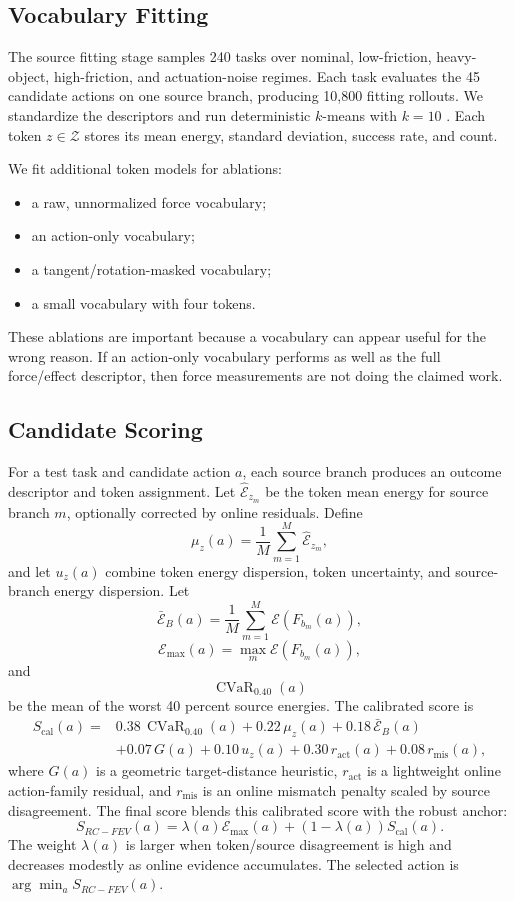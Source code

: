 \documentclass{article}
\newcommand{\method}{RC-FEV}
\newcommand{\energy}{\mathcal{E}}
\newcommand{\tokens}{\mathcal{Z}}
\newcommand{\cvar}{\operatorname{CVaR}}
\begin{document}
\subsection{Vocabulary Fitting}

The source fitting stage samples 240 tasks over nominal, low-friction, heavy-object, high-friction, and actuation-noise regimes. Each task evaluates the 45 candidate actions on one source branch, producing 10,800 fitting rollouts. We standardize the descriptors and run deterministic $k$-means with $k=10$ \citep{lloyd1982least}. Each token $z\in\tokens$ stores its mean energy, standard deviation, success rate, and count.

We fit additional token models for ablations:

\begin{itemize}
\item a raw, unnormalized force vocabulary;
\item an action-only vocabulary;
\item a tangent/rotation-masked vocabulary;
\item a small vocabulary with four tokens.
\end{itemize}

These ablations are important because a vocabulary can appear useful for the wrong reason. If an action-only vocabulary performs as well as the full force/effect descriptor, then force measurements are not doing the claimed work.

\subsection{Candidate Scoring}

For a test task and candidate action $a$, each source branch produces an outcome descriptor and token assignment. Let $\hat{\energy}_{z_m}$ be the token mean energy for source branch $m$, optionally corrected by online residuals. Define
\[
  \mu_z(a)=\frac{1}{M}\sum_{m=1}^M \hat{\energy}_{z_m},
\]
and let $u_z(a)$ combine token energy dispersion, token uncertainty, and source-branch energy dispersion. Let
\[
  \bar{\energy}_{B}(a)=\frac{1}{M}\sum_{m=1}^M \energy(F_{b_m}(a)),
\]
\[
  \energy_{\max}(a)=\max_m \energy(F_{b_m}(a)),
\]
and
\[
  \cvar_{0.40}(a)
\]
be the mean of the worst 40 percent source energies. The calibrated score is
\[
\begin{aligned}
S_{\mathrm{cal}}(a) =
&0.38\,\cvar_{0.40}(a)
+0.22\,\mu_z(a)
+0.18\,\bar{\energy}_{B}(a)\\
&+0.07\,G(a)
+0.10\,u_z(a)
+0.30\,r_{\mathrm{act}}(a)
+0.08\,r_{\mathrm{mis}}(a),
\end{aligned}
\]
where $G(a)$ is a geometric target-distance heuristic, $r_{\mathrm{act}}$ is a lightweight online action-family residual, and $r_{\mathrm{mis}}$ is an online mismatch penalty scaled by source disagreement. The final score blends this calibrated score with the robust anchor:
\[
  S_{\method}(a)=\lambda(a)\energy_{\max}(a)+(1-\lambda(a))S_{\mathrm{cal}}(a).
\]
The weight $\lambda(a)$ is larger when token/source disagreement is high and decreases modestly as online evidence accumulates. The selected action is $\arg\min_a S_{\method}(a)$.
\end{document}
